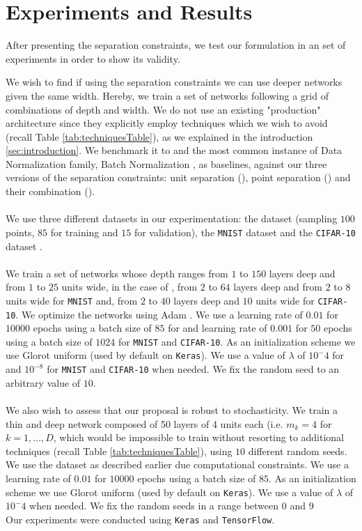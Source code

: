 \section{Experiments and Results}\label{sec:experiments}
After presenting the separation constraints, we test our formulation in an set of experiments in order to show its validity.

We wish to find if using the separation constraints we can use deeper networks given the same width. Hereby, we train a set of networks following a grid of combinations of depth and width. We do not use an existing "production" architecture since they explicitly employ techniques which we wish to avoid (recall Table \ref{tab:techniquesTable}),  as we explained in the introduction \ref{sec:introduction}. We benchmark it to \ReLU and the most common instance of Data Normalization family, Batch Normalization \cite{batchnorm}, as baselines, against our three versions of the separation constraints: unit separation (\SepUnit), point separation (\SepPoint) and their combination (\SepUnitPoint). 
\\\\
We use three different datasets in our experimentation: the \moons dataset (sampling $100$ points, $85$ for training and $15$ for validation), the \texttt{MNIST} dataset \cite{mnist} and the \texttt{CIFAR-10} dataset \cite{cifar10}.
\\\\
We train a set of networks whose depth ranges from $1$ to $150$ layers deep and from $1$ to $25$ units wide, in the case of \moons, from $2$ to $64$ layers deep and from $2$ to $8$ units wide for \texttt{MNIST} and, from $2$ to $40$ layers deep and $10$ units wide for \texttt{CIFAR-10}. We optimize the networks using Adam \cite{adam}. We use a learning rate of $0.01$ for $10000$ epochs using a batch size of $85$ for \moons and learning rate of $0.001$ for $50$ epochs using a batch size of $1024$ for \texttt{MNIST} and \texttt{CIFAR-10}. As an initialization scheme we use Glorot uniform \cite{Glorot10Initialization} (used by default on \texttt{Keras}). We use a value of $\lambda$ of $10^-4$ for \moons and $10^{-8}$ for \texttt{MNIST} and \texttt{CIFAR-10} when needed. We fix the random seed to an arbitrary value of $10$. 
\\\\
We also wish to assess that our proposal is robust to stochasticity. We train a thin and deep network composed of 50 layers of 4 units each (i.e. $m_k=4$ for $k=1,\ldots,D$, which would be impossible to train without resorting to additional techniques (recall Table \ref{tab:techniquesTable}), using $10$ different random seeds. We use the \moons dataset as described earlier due computational constraints. We use a learning rate of $0.01$ for $10000$ epochs using a batch size of $85$. As an initialization scheme we use Glorot uniform \cite{Glorot10Initialization} (used by default on \texttt{Keras}). We use a value of $\lambda$ of $10^-4$ when needed. We fix the random seeds in a range between $0$ and $9$
\\
Our experiments were conducted using \texttt{Keras}\cite{keras} and \texttt{TensorFlow}\cite{tensorflow}.

